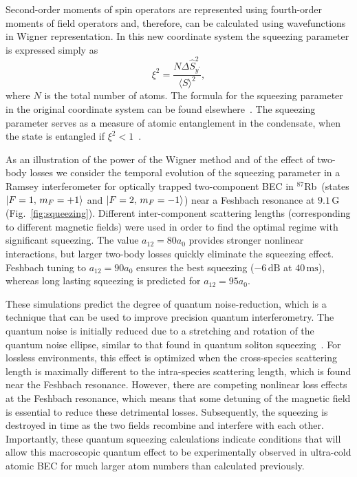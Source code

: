 \documentclass[aps,prl,twocolumn,showpacs,amsmath,amssymb,superscriptaddress,flushbottom,noraggedfooter]{revtex4-1}
\newcommand{\Rb}{$^{87}$Rb}
\newcommand{\figref}[1]{Fig.~\ref{#1}}
\newcommand{\ket}[1]{\mbox{\ensuremath{\vert #1 \rangle}}}
\begin{document}
Second-order moments of spin operators are represented using fourth-order moments of field operators
and, therefore, can be calculated using wavefunctions in Wigner representation.
In this new coordinate system the squeezing parameter is expressed simply as
\begin{equation}
\label{eqn:squeezing}
	\xi^2 = \frac{N \Delta \hat{S}^2_{y^\prime}}{\langle S \rangle^2},
\end{equation}
where $N$ is the total number of atoms.
The formula for the squeezing parameter in the original coordinate system can be found elsewhere~\cite{Li2009}.
The squeezing parameter serves as a measure of atomic entanglement in the condensate,
when the state is entangled if $\xi^2 < 1$~\cite{Sorensen2001}.

As an illustration of the power of the Wigner method and of the effect of two-body losses we consider the temporal evolution of the squeezing parameter in a Ramsey interferometer for optically trapped two-component BEC in \Rb\ (states ${\ket{F=1,\, m_F=+1}}$ and ${\ket{F=2,\, m_F=-1}}$) near a Feshbach resonance at $9.1\,\mathrm{G}$ (\figref{fig:squeezing}).
Different inter-component scattering lengths (corresponding to different magnetic fields)
were used in order to find the optimal regime with significant squeezing.
The value $a_{12} = 80 a_0$ provides stronger nonlinear interactions, but larger two-body losses quickly eliminate the squeezing effect.
Feshbach tuning to $a_{12} = 90 a_0$ ensures the best squeezing ($-6\,\mathrm{dB}$ at $40\,\mathrm{ms}$), whereas long lasting squeezing is predicted for $a_{12} = 95 a_0$.

These simulations predict the degree of quantum noise-reduction, which
is a technique that can be used to improve precision quantum interferometry.
The quantum noise is initially reduced due to a stretching and rotation
of the quantum noise ellipse, similar to that found in quantum soliton
squeezing~\cite{Carter1987,Drummond1993a}.
For lossless environments, this effect is optimized when the cross-species
scattering length is maximally different to the intra-species scattering
length, which is found near the Feshbach resonance.
However, there are competing nonlinear loss effects at the Feshbach resonance,
which means that some detuning of the magnetic field is essential to reduce
these detrimental losses.
Subsequently, the squeezing is destroyed in time as the two fields recombine
and interfere with each other.
Importantly, these quantum squeezing calculations indicate conditions that
will allow this macroscopic quantum effect to be experimentally
observed in ultra-cold atomic BEC for much larger atom
numbers than calculated previously.
\end{document}
